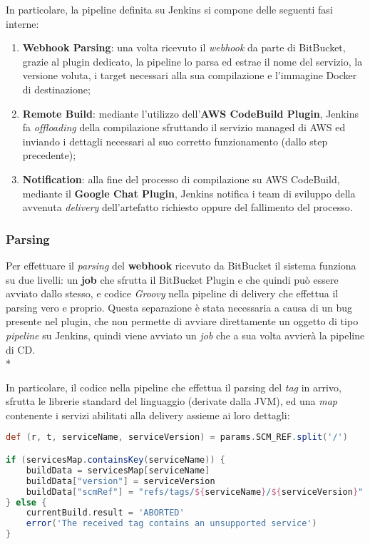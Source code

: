 \documentclass[../main.tex]{subfiles}
\begin{document}
        	    In particolare, la pipeline definita su Jenkins si compone delle seguenti fasi interne:
        	    \begin{enumerate}
        	        \item \textbf{Webhook Parsing}: una volta ricevuto il \emph{webhook} da parte di BitBucket, grazie al plugin dedicato, la pipeline lo parsa ed estrae il nome del servizio, la versione voluta, i target necessari alla sua compilazione e l'immagine Docker di destinazione;
        	        \item \textbf{Remote Build}: mediante l'utilizzo dell'\textbf{AWS CodeBuild Plugin}, Jenkins fa \emph{offloading} della compilazione sfruttando il servizio managed di AWS ed inviando i dettagli necessari al suo corretto funzionamento (dallo step precedente);
        	        \item \textbf{Notification}: alla fine del processo di compilazione su AWS CodeBuild, mediante il \textbf{Google Chat Plugin}, Jenkins notifica i team di sviluppo della avvenuta \emph{delivery} dell'artefatto richiesto oppure del fallimento del processo.
        	    \end{enumerate}
        	    
        	    \subsubsection{Parsing}
        	    
        	        Per effettuare il \emph{parsing} del \textbf{webhook} ricevuto da BitBucket il sistema funziona su due livelli: un \textbf{job} che sfrutta il BitBucket Plugin e che quindi può essere avviato dallo stesso, e codice \emph{Groovy} nella pipeline di delivery che effettua il parsing vero e proprio. Questa separazione è stata necessaria a causa di un bug presente nel plugin, che non permette di avviare direttamente un oggetto di tipo \emph{pipeline} su Jenkins, quindi viene avviato un \emph{job} che a sua volta avvierà la pipeline di CD.\\*
        	        
        	        In particolare, il codice nella pipeline che effettua il parsing del \emph{tag} in arrivo, sfrutta le librerie standard del linguaggio (derivate dalla JVM), ed una \emph{map} contenente i servizi abilitati alla delivery assieme ai loro dettagli:
        	        \begin{lstlisting}[language=Groovy]
def (r, t, serviceName, serviceVersion) = params.SCM_REF.split('/')

if (servicesMap.containsKey(serviceName)) {
    buildData = servicesMap[serviceName]
    buildData["version"] = serviceVersion
    buildData["scmRef"] = "refs/tags/${serviceName}/${serviceVersion}"
} else {
    currentBuild.result = 'ABORTED'
    error('The received tag contains an unsupported service')
}
        	        \end{lstlisting}
        	        
\end{document}
